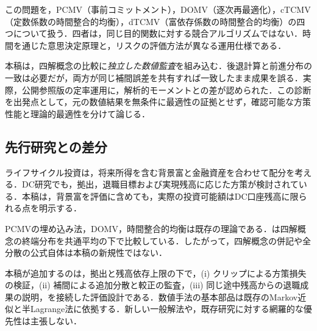 \documentclass[10pt,a4paper]{article}
\numberwithin{equation}{section}
\numberwithin{table}{section}
\numberwithin{figure}{section}
\theoremstyle{plain}
\theoremstyle{definition}
\begin{document}
この問題を，PCMV（事前コミットメント），DOMV（逐次再最適化），cTCMV（定数係数の時間整合的均衡），dTCMV（富依存係数の時間整合的均衡）の四つについて扱う．四者は，同じ目的関数に対する競合アルゴリズムではない．時間を通じた意思決定原理と，リスクの評価方法が異なる運用仕様である．

本稿は，四解概念の比較に\emph{独立した数値監査}を組み込む．後退計算と前進分布の一致は必要だが，両方が同じ補間誤差を共有すれば一致したまま成果を誤る．実際，公開参照版の定率運用に，解析的モーメントとの差が認められた．この診断を出発点として，元の数値結果を無条件に最適性の証拠とせず，確認可能な方策性能と理論的最適性を分けて論じる．

\subsection{先行研究との差分}
ライフサイクル投資は，将来所得を含む背景富と金融資産を合わせて配分を考える\citep{Merton1969,BodieMertonSamuelson1992,Viceira2001}．DC研究でも，拠出，退職目標および実現残高に応じた方策が検討されている\citep{CairnsBlakeDowd2006,VignaHaberman2001,HabermanVigna2002,Vigna2014,MenoncinVigna2017}．本稿は，背景富を評価に含めても，実際の投資可能額はDC口座残高に限られる点を明示する．

PCMVの埋め込み法\citep{LiNg2000,ZhouLi2000}，DOMV\citep{PedersenPeskir2017,MenoncinVigna2020}，時間整合的均衡\citep{BasakChabakauri2010,BjorkMurgociZhou2014,BjorkKhapkoMurgoci2017}は既存の理論である．\citet{vanStadenDangForsyth2021}は四解概念の終端分布を共通平均の下で比較している．したがって，四解概念の併記や全分散の公式自体は本稿の新規性ではない．

本稿が追加するのは，拠出と残高依存上限の下で，(i) クリップによる方策損失の検証，(ii) 補間による追加分散と較正の監査，(iii) 同じ途中残高からの退職成果の説明，を接続した評価設計である．数値手法の基本部品は既存のMarkov近似と半Lagrange法に依拠する\citep{KushnerDupuis2001,FalconeFerretti2014}．新しい一般解法や，既存研究に対する網羅的な優先性は主張しない．
\end{document}
